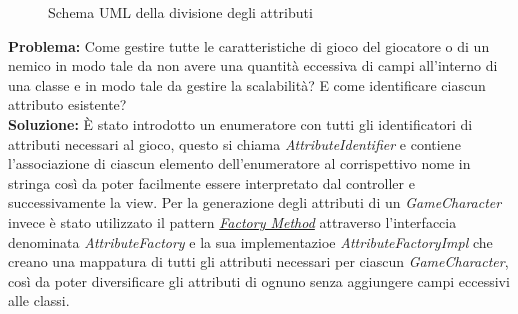 \documentclass[a4paper,12pt]{report}
\begin{document}
\begin{figure}[H]
	\centering
	
	\caption{Schema UML della divisione degli attributi}
	\label{fig:Schema UML della divisione degli attributi}
\end{figure}

\textbf{Problema:} Come gestire tutte le caratteristiche di gioco del giocatore o di un nemico in modo tale da non avere una quantità eccessiva di campi all'interno di una classe e in modo tale da gestire la scalabilità? E come identificare ciascun attributo esistente?\\
\textbf{Soluzione:} È stato introdotto un enumeratore con tutti gli identificatori di attributi necessari al gioco, questo si chiama \textit{AttributeIdentifier} e contiene l'associazione di ciascun elemento dell'enumeratore al corrispettivo nome in stringa così da poter facilmente essere interpretato dal controller e successivamente la view.
Per la generazione degli attributi di un \textit{GameCharacter} invece è stato utilizzato il pattern \href{https://refactoring.guru/design-patterns/factory-method}{\textit{Factory Method}} attraverso l'interfaccia denominata \textit{AttributeFactory} e la sua implementazioe \textit{AttributeFactoryImpl} che creano una mappatura di tutti gli attributi necessari per ciascun \textit{GameCharacter}, così da poter diversificare gli attributi di ognuno senza aggiungere campi eccessivi alle classi.
\end{document}
